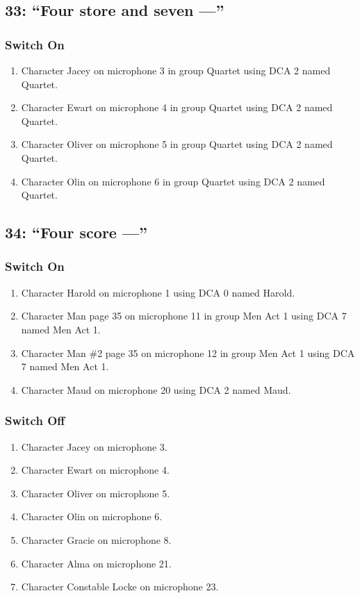\subsection* {33: ``Four store and seven ---''}
\subsubsection* {Switch On}
\begin{enumerate}
\item Character Jacey on microphone 3 in group Quartet using DCA 2 named Quartet.
\item Character Ewart on microphone 4 in group Quartet using DCA 2 named Quartet.
\item Character Oliver on microphone 5 in group Quartet using DCA 2 named Quartet.
\item Character Olin on microphone 6 in group Quartet using DCA 2 named Quartet.
\end{enumerate}
\subsection* {34: ``Four score ---''}
\subsubsection* {Switch On}
\begin{enumerate}
\item Character Harold on microphone 1 using DCA 0 named Harold.
\item Character Man page 35 on microphone 11 in group Men Act 1 using DCA 7 named Men Act 1.
\item Character Man \#2 page 35 on microphone 12 in group Men Act 1 using DCA 7 named Men Act 1.
\item Character Maud on microphone 20 using DCA 2 named Maud.
\end{enumerate}
\subsubsection* {Switch Off}
\begin{enumerate}
\item Character Jacey on microphone 3.
\item Character Ewart on microphone 4.
\item Character Oliver on microphone 5.
\item Character Olin on microphone 6.
\item Character Gracie on microphone 8.
\item Character Alma on microphone 21.
\item Character Constable Locke on microphone 23.
\end{enumerate}
